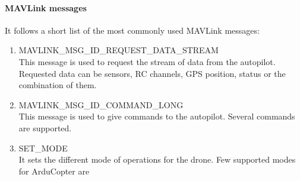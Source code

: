 \paragraph{MAVLink messages\\} %
\label{par:mavlink_messages}
It follows a short list of the most commonly used MAVLink messages:
\begin{enumerate}
	\item MAVLINK\_MSG\_ID\_REQUEST\_DATA\_STREAM\\ This message is used to request the stream of data from the autopilot. Requested data can be sensors, RC channels, GPS position, status or the combination of them.
	\item MAVLINK\_MSG\_ID\_COMMAND\_LONG\\ This message is used to give commands to the autopilot. Several commands are supported.
	\item SET\_MODE\\ It sets the different mode of operations for the drone. Few supported modes for ArduCopter are	
\end{enumerate}



